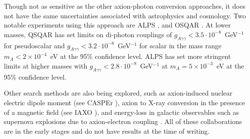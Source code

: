 Though not as sensitive as the other axion-photon conversion approaches, it does not have the same uncertainties associated with astrophysics and cosmology.
Two notable experiments using this approach are ALPS \cite{alps_axion_result_ref}, and OSQAR \cite{osqar_axion_result_ref}.
At lower masses, QSQAR has set limits on di-photon couplings of $g_{A \gamma \gamma}<3.5\cdot10^{-8}$~GeV$^{-1}$ for pseudoscalar and $g_{A \gamma \gamma}<3.2\cdot10^{-8}$~GeV$^{-1}$ for scalar in the mass range $m_A < 2 \times 10^{-4}$~eV at the 95\% confidence level.
ALPS has set more stringent limits at higher masses with $g_{A \gamma \gamma}<2.8\cdot10^{-8}$~GeV$^{-1}$ at $m_A = 5 \times 10^{-3}$~eV at the 95\% confidence level.

\par
Other search methods are also being explored, such as axion-induced nuclear electric dipole moment (see CASPEr \cite{casper_experiment_ref}), axion to X-ray conversion in the presence of a magnetic field (see IAXO \cite{iaxo_experiment_ref}), and energy-loss in galactic observables such as supernova explosions due to axion-electron coupling \cite{axions_from_supernova_ref}.
All of these collaborations are in the early stages and do not have results at the time of writing.

